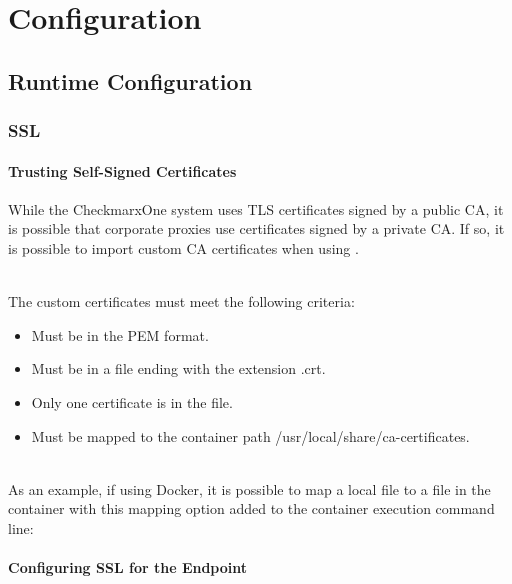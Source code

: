 \chapter{Configuration}


\section{Runtime Configuration}

\subsection{SSL}

\subsubsection{Trusting Self-Signed Certificates}\label{sec:self-signed-certs}

While the CheckmarxOne system uses TLS certificates signed by a public CA, it is possible that
corporate proxies use certificates signed by a private CA. If so, it is possible to
import custom CA certificates when using \cxoneflow.

\noindent\\The custom certificates must meet the following criteria:

\begin{itemize}
    \item Must be in the PEM format.
    \item Must be in a file ending with the extension .crt.
    \item Only one certificate is in the file.
    \item Must be mapped to the container path /usr/local/share/ca-certificates.
\end{itemize}


\noindent\\As an example, if using Docker, it is possible to map a local file to a file in the container with this mapping option added to the container execution command line:


\subsubsection{Configuring SSL for the \cxoneflow Endpoint}

